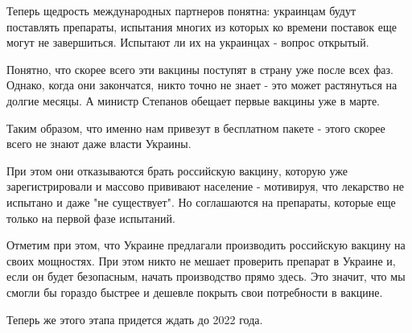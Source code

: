 Теперь щедрость международных партнеров понятна: украинцам будут поставлять
препараты, испытания многих из которых ко времени поставок еще могут не
завершиться. Испытают ли их на украинцах - вопрос открытый. 

Понятно, что скорее всего эти вакцины поступят в страну уже после всех фаз.
Однако, когда они закончатся, никто точно не знает - это может растянуться на
долгие месяцы. А министр Степанов обещает первые вакцины уже в марте. 

Таким образом, что именно нам привезут в бесплатном пакете - этого скорее всего
не знают даже власти Украины. 

При этом они отказываются брать российскую вакцину, которую уже
зарегистрировали и массово прививают население - мотивируя, что лекарство не
испытано и даже "не существует". Но соглашаются на препараты, которые еще
только на первой фазе испытаний. 

Отметим при этом, что Украине предлагали производить российскую вакцину на
своих мощностях. При этом никто не мешает проверить препарат в Украине и, если
он будет безопасным, начать производство прямо здесь. Это значит, что мы смогли
бы гораздо быстрее и дешевле покрыть свои потребности в вакцине. 

Теперь же этого этапа придется ждать до 2022 года. 
